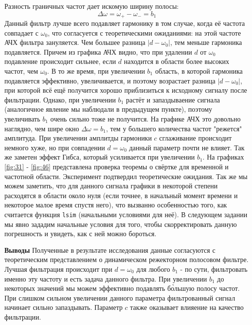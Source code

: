 Разность граничных частот дает искомую ширину полосы:
$$
\Delta\omega = \omega_+ - \omega_- = b_1
$$
Данный фильтр лучше всего подавляет гармонику в том случае, когда её частота совпадает с $\omega_0$, что согласуется с теоретическими ожиданиями: на этой частоте АЧХ фильтра зануляется. Чем большее разница $|d-\omega_0|$, тем меньше гармоника подавляется. Причем из графика АЧХ видно, что при удалении $d$ от $\omega_0$ подавление происходит сильнее, если $d$ находится в области более высоких частот, чем $\omega_0$. В то же время, при увеличении $b_1$ область, в которой гармоника подавляется эффективно, увеличивается, и поэтому возрастает разница $|d-\omega_0|$, при которой всё ещё получится хорошо приблизиться к исходному сигналу после фильтрации. Однако, при увеличении $b_1$ растёт и запаздываение сигнала (аналогичное явление мы наблюдали в предыдущем пункте), поэтому увеличивать $b_1$ очень сильно тоже не получится. На графике АЧХ это довольно наглядно, чем шире окно $\Delta\omega= b_1$, тем у большего количества частот "режется" амплитуда.
\newline
При увеличении амплитды гармоники $c$ сглаживание происходит немного хуже, но при совпадении $d=\omega_0$ данный параметр почти не влияет.
\newline
Так же заметен эффект Гибса, который усиливается при увеличении $b_1$.
\newline
На графиках \ref{fig:31} - \ref{fig:46} представлена проверка теоремы о свёртке для временной и частотной области. Эксперимент подтвердил теоретические ожидания. Так же мы можем заметить, что для данного сигнала графики в некоторой степени расходятся в области около нуля (если точнее, в начальный момент времени и некоторое малое время спустя него), что вызванно особенностью того, как считается функция \texttt{lsim} (начальными условиями для неё). В следующем задании мы явно зададим начальные условия для того, чтобы скорректировать данную погрешность и увидеть, как с ней можно бороться.


\textbf{Выводы}
\newline
Полученные в результате исследования данные согласуются с теоретическим представлением о динамическом режекторном полосовом фильтре.
\newline
Лучшая фильтрация происходит при $d=\omega_0$ для любого $b_1$ - по сути, фильтровать именно эту частоту и есть задача данного фильтра. При увеличении $b_1$ до некоторых значений мы можем эффективно подавлять б\`ольшую полосу частот. При слишком сильном увеличении данного параметра фильтрованный сигнал начинает сильно запаздывать. Параметр $c$ также оказывает влияение на качество фильтрации.

